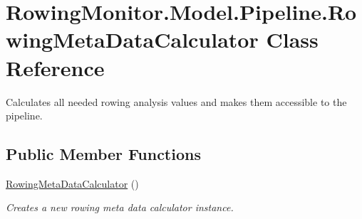 \hypertarget{class_rowing_monitor_1_1_model_1_1_pipeline_1_1_rowing_meta_data_calculator}{}\section{Rowing\+Monitor.\+Model.\+Pipeline.\+Rowing\+Meta\+Data\+Calculator Class Reference}
\label{class_rowing_monitor_1_1_model_1_1_pipeline_1_1_rowing_meta_data_calculator}


Calculates all needed rowing analysis values and makes them accessible to the pipeline.  


\subsection*{Public Member Functions}
\begin{DoxyCompactItemize}
\item 
\hyperlink{class_rowing_monitor_1_1_model_1_1_pipeline_1_1_rowing_meta_data_calculator_af1602d11001fcae17d0cb717d494f78a}{Rowing\+Meta\+Data\+Calculator} ()
\begin{DoxyCompactList}\small\item\em Creates a new rowing meta data calculator instance. \end{DoxyCompactList}\end{DoxyCompactItemize}
